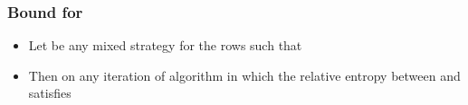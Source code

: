\documentclass[handout]{beamer}
\begin{document}
\begin{frame}
\frametitle{Bound for \R{\lwalgvar}}
\begin{itemize}
\item Let \R{$\Pref$} be any mixed strategy for the rows such that 
\item
  Then on any iteration of algorithm \R{\lwalgvar} in which 
 the relative entropy between \R{$\Pref$} and 
satisfies
\end{itemize}
\end{frame}

%
\end{document}
